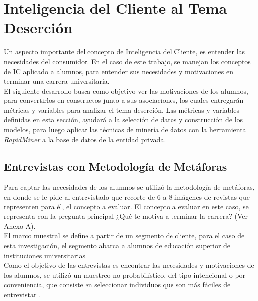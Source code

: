 \chapter[Inteligencia del Cliente al Tema Deserción]{Inteligencia del Cliente al Tema Deserción}
\label{ch:des}


Un aspecto importante del concepto de Inteligencia del Cliente, es entender las necesidades del consumidor. En el caso de este trabajo, se manejan los conceptos de IC aplicado a alumnos, para entender sus necesidades y motivaciones en terminar una carrera universitaria.\\

El siguiente desarrollo busca como objetivo ver las motivaciones de los alumnos, para convertirlos en constructos junto a sus asociaciones, los cuales entregarán métricas y variables para analizar el tema deserción. Las métricas y variables definidas en esta sección, ayudará a la selección de datos y construcción de los modelos, para luego aplicar las técnicas de minería de datos con la herramienta \textit{RapidMiner} a la base de datos de la entidad  privada.

\section{Entrevistas con Metodología de Metáforas}


Para captar las necesidades de los alumnos se utilizó la metodología de metáforas, en donde se le pide al entrevistado que recorte de 6 a 8 imágenes de revistas que representen para él, el concepto a evaluar. El concepto a evaluar en este caso, se representa con la pregunta principal ¿Qué te motiva a terminar la carrera? (Ver Anexo A).\\

El marco muestral se define a partir de un segmento de cliente, para el caso de esta investigación, el segmento abarca a alumnos de educación superior de instituciones universitarias.\\

Como el objetivo de las entrevistas es encontrar las necesidades y motivaciones de los alumnos, se utilizó un muestreo no probabilístico, del tipo intencional o por conveniencia, que consiste en seleccionar individuos que son más fáciles de entrevistar \cite{muestra}.\\


